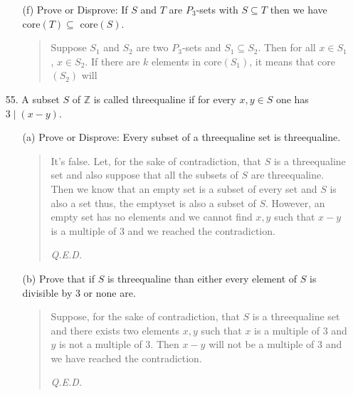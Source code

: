 \documentclass[12pt, a4paper]{article}                      %
\begin{document}
\begin{itemize}
\begin{itemize}
\item[]
\item[(f)]
Prove or Disprove: If $S$ and $T$ are $P_3$-sets with $S \subseteq T$ then we have $\mbox{core}(T) \subseteq \mbox{ core}(S)$.
\begin{quote}
Suppose $S_1$ and $S_2$ are two $P_3$-sets and $S_1 \subseteq S_2$. Then for all $x \in S_1$, $x \in S_2$.
If there are $k$ elements in core$(S_1)$, it means that core$(S_2)$ will 
\end{quote}
\end{itemize}

\item[]
\item[]

\item[55.]
A subset $S$ of $\mathbb{Z}$ is called threequaline if for every $x, y \in S$ one has $3 \mid (x - y)$.
\begin{itemize}
\item[(a)]
Prove or Disprove: Every subset of a threequaline set is threequaline.
\begin{quote}
It's false. Let, for the sake of contradiction, that $S$ is a threequaline set and also suppose that all the subsets of $S$ are threequaline. Then we know that an empty set is a subset of every set and $S$ is also a set thus, the emptyset is also a subset of $S$. However, an empty set has no elements and we cannot find $x, y$ such that $x - y$ is a multiple of 3 and we reached the contradiction.
\begin{flushright}
\textit{Q.E.D.}
\end{flushright}
\end{quote}

\item[]

\item[(b)]
Prove that if $S$ is threequaline than either every element of $S$ is divisible by 3 or none are.
\begin{quote}
Suppose, for the sake of contradiction, that $S$ is a threequaline set and there exists two elements $x, y$ such that $x$ is a multiple of 3 and $y$ is not a multiple of 3. Then $x - y$ will not be a multiple of 3 and we have reached the contradiction.
\begin{flushright}
\textit{Q.E.D.}
\end{flushright}
\end{quote}

\item[]


\end{itemize}
\end{itemize}
\end{document}
